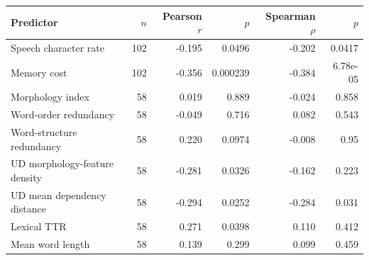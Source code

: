\begin{tabular}{lrrrrr}\toprule Predictor & $n$ & Pearson $r$ & $p$ & Spearman $\rho$ & $p$\\ \midrule
Speech character rate & 102 & -0.195 & 0.0496 & -0.202 & 0.0417\\
Memory cost & 102 & -0.356 & 0.000239 & -0.384 & 6.78e-05\\
Morphology index & 58 & 0.019 & 0.889 & -0.024 & 0.858\\
Word-order redundancy & 58 & -0.049 & 0.716 & 0.082 & 0.543\\
Word-structure redundancy & 58 & 0.220 & 0.0974 & -0.008 & 0.95\\
UD morphology-feature density & 58 & -0.281 & 0.0326 & -0.162 & 0.223\\
UD mean dependency distance & 58 & -0.294 & 0.0252 & -0.284 & 0.031\\
Lexical TTR & 58 & 0.271 & 0.0398 & 0.110 & 0.412\\
Mean word length & 58 & 0.139 & 0.299 & 0.099 & 0.459\\
\bottomrule\end{tabular}
